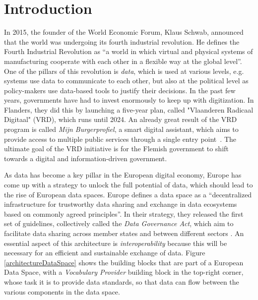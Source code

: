 \documentclass[manuscript]{acmart}
\begin{document}
\section{Introduction}
In 2015, the founder of the World Economic Forum, Klaus Schwab, announced that the world was undergoing its fourth industrial revolution. 
He defines the Fourth Industrial Revolution as ``a world in which virtual and physical systems of manufacturing cooperate with each other in a flexible way at the global level''\cite{schwab2017fourth}. 
One of the pillars of this revolution is \emph{data}, which is used at various levels, e.g. systems use data to communicate to each other, but also at the political level as policy-makers use data-based tools to justify their decisions.
In the past few years, governments have had to invest enormously to keep up with digitization.
In Flanders, they did this by launching a five-year plan, called "Vlaanderen Radicaal Digitaal" (VRD), which runs until 2024.
An already great result of the VRD program is called \textit{Mijn Burgerprofiel}, a smart digital assistant, which aims to provide access to multiple public services through a single entry point~\cite{buyle2018semantics}.
The ultimate goal of the VRD initiative is for the Flemish government to shift towards a digital and information-driven government.


As data has become a key pillar in the European digital economy, Europe has come up with a strategy to unlock the full potential of data, which should lead to the rise of European data spaces.
Europe defines a data space as a ``decentralized infrastructure for trustworthy data sharing and exchange in data ecosystems based on commonly agreed principles''.
In their strategy, they released the first set of guidelines, collectively called the \emph{Data Governance Act}, which aim to facilitate data sharing across member states and between different sectors \cite{designDataSpaces, dataGovernanceAct}.
An essential aspect of this architecture is \emph{interoperability} because this will be necessary for an efficient and sustainable exchange of data.
Figure \ref{architectureDataSpace} shows the building blocks that are part of a European Data Space, with a \emph{Vocabulary Provider} building block in the top-right corner, whose task it is to provide data standards, so that data can flow between the various components in the data space.
\end{document}
